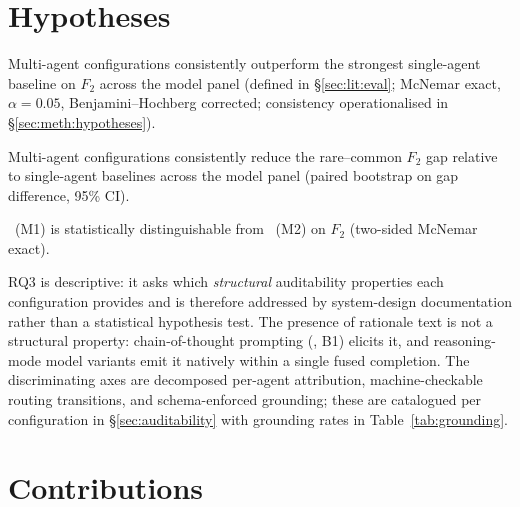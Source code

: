 \section{Hypotheses}\label{sec:hypotheses}

\begin{description}[leftmargin=2.5em, labelwidth=2em, itemsep=2pt]
  \item[\textbf{H1.}] Multi-agent configurations consistently outperform the
    strongest single-agent baseline on $F_2$ across the model panel
    (defined in §\ref{sec:lit:eval}; McNemar exact, $\alpha{=}0.05$,
    Benjamini--Hochberg corrected; consistency operationalised in §\ref{sec:meth:hypotheses}).
  \item[\textbf{H2.}] Multi-agent configurations consistently reduce the rare--common
    $F_2$ gap relative to single-agent baselines across the model panel
    (paired bootstrap on gap difference, 95\% CI).
  \item[\textbf{H3.}] \cfgMA\ (M1) is statistically distinguishable
    from \cfgCP\ (M2) on $F_2$ (two-sided McNemar exact).
\end{description}

RQ3 is descriptive: it asks which \emph{structural} auditability properties
each configuration provides and is therefore addressed by system-design
documentation rather than a statistical hypothesis test. The presence of
rationale text is not a structural property: chain-of-thought prompting
(\cfgCoT, B1) elicits it, and reasoning-mode model variants emit it natively
within a single fused completion. The discriminating axes are decomposed
per-agent attribution, machine-checkable routing transitions, and
schema-enforced grounding; these are catalogued per configuration in
\S\ref{sec:auditability} with grounding rates in Table~\ref{tab:grounding}.

\section{Contributions}\label{sec:contributions}

